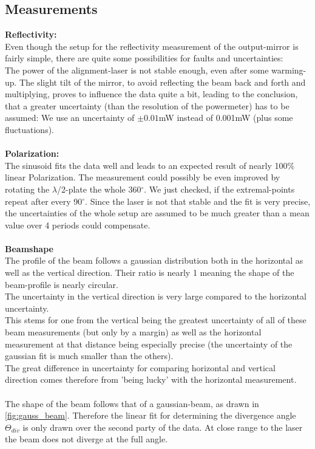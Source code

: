 \documentclass[12pt,a4paper]{article}
\begin{document}
\begin{multicols}{2}
\subsection{Measurements}
\textbf{Reflectivity:}\\
Even though the setup for the reflectivity measurement of the output-mirror is fairly simple, there are quite some possibilities for faults and uncertainties:\\
The power of the alignment-laser is not stable enough, even after some warming-up. The slight tilt of the mirror, to avoid reflecting the beam back and forth and multiplying, proves to influence the data quite a bit, leading to the conclusion, that a greater uncertainty (than the resolution of the powermeter) has to be assumed: We use an uncertainty of $\pm 0.01$mW instead of 0.001mW (plus some fluctuations).\\
\\
\textbf{Polarization:}\\
The sinusoid fits the data well and leads to an expected result of nearly 100$\%$ linear Polarization. The  measurement could possibly be even improved by rotating the $\lambda$/2-plate the whole 360$^{\circ}$. We just checked, if the extremal-points repeat after every 90$^{\circ}$. Since the laser is not that stable and the fit is very precise, the uncertainties of the whole setup are assumed to be much greater than a mean value over 4 periods could compensate.\\
\\
\textbf{Beamshape}\\
The profile of the beam follows a gaussian distribution both in the horizontal as well as the vertical direction. Their ratio is nearly 1 meaning the shape of the beam-profile is nearly circular.\\
The uncertainty in the vertical direction is very large compared to the horizontal uncertainty.\\This stems for one from the vertical being the greatest uncertainty of all of these beam measurements (but only by a margin) as well as the horizontal measurement at that distance being especially precise (the uncertainty of the gaussian fit is much smaller than the others).\\
The great difference in uncertainty for comparing horizontal and vertical direction comes therefore from 'being lucky' with the horizontal measurement.\\
\\
The shape of the beam follows that of a gaussian-beam, as drawn in \ref{fig:gauss_beam}. Therefore the linear fit for determining the divergence angle $\Theta_{div}$ is only drawn over the second party of the data. At close range to the laser the beam does not diverge at the full angle.\\

\end{multicols}
\end{document}
